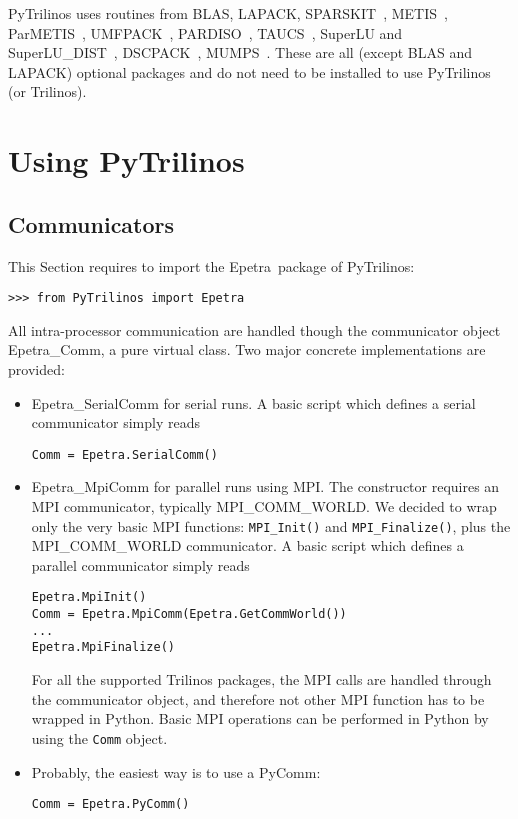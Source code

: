 \documentclass[10pt,relax]{SANDreport}
\newcommand{\PyTrilinos}{{PyTrilinos}}
\newcommand{\epetra}{{Epetra}}
\begin{document}
\medskip

PyTrilinos uses routines from
BLAS,
LAPACK,
SPARSKIT~\cite{sparskit},
METIS~\cite{metis},
ParMETIS~\cite{parmetis},
UMFPACK~\cite{umfpack-manual},
PARDISO~\cite{pardiso-manual},
TAUCS~\cite{taucs-manual},
SuperLU and SuperLU\_DIST~\cite{superlu-manual},
DSCPACK~\cite{dscpack-manual},
MUMPS~\cite{mumps-manual}.
These are all (except BLAS and LAPACK) optional packages and do not need to be
installed to use PyTrilinos (or Trilinos).

\section{Using PyTrilinos}
\label{sec:using}

\subsection{Communicators}
\label{sec:communicators}

This Section requires to import the \epetra\ package of \PyTrilinos:
\begin{verbatim}
>>> from PyTrilinos import Epetra
\end{verbatim}

All intra-processor communication are handled though the communicator object
Epetra\_Comm, a pure virtual class. Two major concrete implementations are
provided:
\begin{itemize}
\item Epetra\_SerialComm for serial runs. A basic script which defines a
serial communicator simply reads
\begin{verbatim}
Comm = Epetra.SerialComm()
\end{verbatim}
\item Epetra\_MpiComm for parallel runs using MPI. The constructor requires an
MPI communicator, typically MPI\_COMM\_WORLD. We decided to wrap only the very
basic MPI functions: {\tt MPI\_Init()} and {\tt MPI\_Finalize()}, plus the
MPI\_COMM\_WORLD communicator.  A basic script which defines a
parallel communicator simply reads
\begin{verbatim}
Epetra.MpiInit()
Comm = Epetra.MpiComm(Epetra.GetCommWorld())
...
Epetra.MpiFinalize()
\end{verbatim}
For all the supported Trilinos packages, the MPI calls are handled through 
the communicator object, and therefore not other MPI function has to be
wrapped in Python. Basic MPI operations can be performed in Python by using
the {\tt Comm} object.
\item Probably, the easiest way is to use a PyComm:
\begin{verbatim}
Comm = Epetra.PyComm()
\end{verbatim}

\end{itemize}
\end{document}
